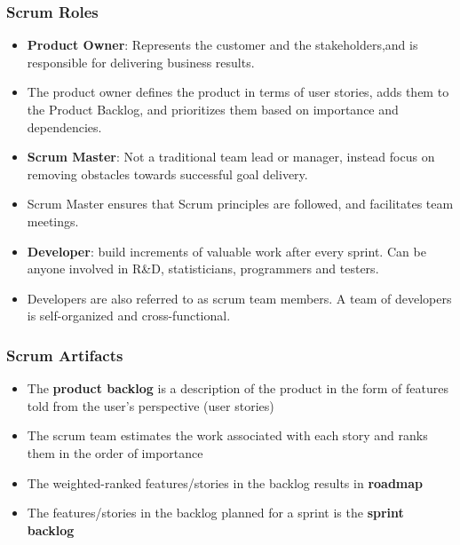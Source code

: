 \documentclass{article}
\begin{document}
\subsubsection{Scrum Roles}
\begin{itemize}
    \item \textbf{Product Owner}: Represents the customer and the stakeholders,and is responsible for delivering business results.  
    
    \item The product owner defines the product in terms of user stories, adds them to the Product Backlog, and prioritizes them based on importance and dependencies.
    
    \item \textbf{Scrum Master}: Not a traditional team lead or manager, instead focus on removing obstacles towards successful goal delivery. 
    
    \item Scrum Master ensures that Scrum principles are followed, and facilitates team meetings.
    
    \item \textbf{Developer}: build increments of valuable work after every sprint. Can be anyone involved in R\&D, statisticians, programmers and testers. 
    
    \item Developers are also referred to as scrum team members. A team of developers is self-organized and cross-functional.
\end{itemize}

\subsubsection{Scrum Artifacts}
\begin{itemize}
    \item The \textbf{product backlog} is a description of the product in the form of features told from the user's perspective (user stories)
    
    \item The scrum team estimates the work associated with each story and ranks them in the order of importance
    
    \item The weighted-ranked features/stories in the backlog results in \textbf{roadmap} 
    
    \item The features/stories in the backlog planned for a sprint is the \textbf{sprint backlog}
\end{itemize}
\end{document}
